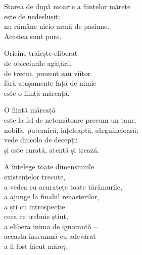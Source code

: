 Starea de după moarte a ființelor mărețe\\
este de nedeslușit;\\
nu rămâne nicio urmă de pasiune.\\
Acestea sunt pure.


Oricine trăiește eliberat\\
de obiceiurile agățării\\
de trecut, prezent sau viitor\\
fără atașamente față de nimic\\
este o ființă măreață.


O ființă măreață\\
este la fel de netemătoare precum un taur,\\
nobilă, puternică, înțeleaptă, sârguincioasă;\\
vede dincolo de decepții\\
și este curată, atentă și trează.


A înțelege toate dimensiunile\\
existențelor trecute,\\
a vedea cu acuratețe toate tărâmurile,\\
a ajunge la finalul renașterilor,\\
a ști cu introspecție\\
ceea ce trebuie știut,\\
a elibera inima de ignoranță –\\
aceasta înseamnă cu adevărat\\
a fi fost făcut măreț.
